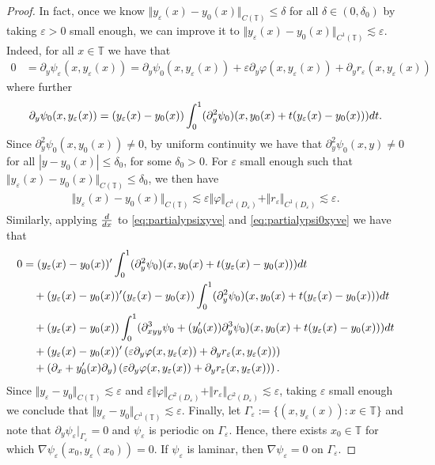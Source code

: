 \documentclass[10pt,a4paper]{amsart}
\newcommand{\rmd}{{\rm d}}
\newcommand{\ve}{\varepsilon}
\begin{document}
\begin{proof}
In fact, once we know $\Vert y_\ve(x) - y_0(x) \Vert_{C(\mathbb{T})}\leq \delta$ for all $\delta\in (0,\delta_0)$ by taking $\ve>0$ small enough, we can improve it to $\Vert y_\ve(x) - y_0(x) \Vert_{C^1(\mathbb{T})}\lesssim \ve$. Indeed, for all $x\in \mathbb{T}$ we have that
\begin{align}\label{eq:partialypsixyve}
0 &= \partial_y\psi_\ve(x,y_\ve(x)) = \partial_y \psi_0(x,y_\ve(x)) + \ve\partial_y\varphi(x,y_\ve(x)) + \partial_y r_\ve(x,y_\ve(x)) 
\end{align}
where further
\begin{align}\label{eq:partialypsi0xyve}
\partial_y \psi_0(x,y_\ve(x)) = (y_\ve(x) - y_0(x) ) \int_0^1 (\partial_y^2\psi_0)(x,y_0(x) + t(y_\ve(x) - y_0(x))) \rmd t.
\end{align}
Since $\partial_y^2\psi_0(x,y_0(x))\neq 0$, by uniform continuity we have that $\partial_y^2\psi_0(x,y)\neq 0$ for all $|y-y_0(x)|\leq \delta_0$, for some $\delta_0>0$. For $\ve$ small enough such that $\Vert y_\ve(x) - y_0(x) \Vert_{C(\mathbb{T})}\leq \delta_0$, we then have
\begin{align*}
\Vert y_\ve(x) - y_0(x) \Vert_{C(\mathbb{T})}\lesssim \ve \Vert \varphi \Vert_{C^1(D_{\ve})} + \Vert r_\ve \Vert_{C^1(D_{\ve})} \lesssim \ve.
\end{align*}
Similarly, applying $\frac{\rmd}{\rmd x}$ to \eqref{eq:partialypsixyve}  and \eqref{eq:partialypsi0xyve} we have that
\begin{align*}
0 &= (y_\ve(x) - y_0(x) )' \int_0^1 (\partial_y^2\psi_0)(x,y_0(x) + t(y_\ve(x) - y_0(x))) \rmd t \\  
&\quad + (y_\ve(x) - y_0(x) )'(y_\ve(x) - y_0(x) ) \int_0^1 (\partial_y^2\psi_0)(x,y_0(x) + t(y_\ve(x) - y_0(x))) \rmd t \\
&\quad + (y_\ve(x) - y_0(x) ) \int_0^1 (\partial_{xyy}^3\psi_0 + (y_0'(x))\partial_y^3\psi_0)(x,y_0(x) + t(y_\ve(x) - y_0(x))) \rmd t \\
&\quad + (y_\ve(x)-y_0(x))' \left( \ve \partial_y\varphi(x,y_\ve(x)) + \partial_y r_\ve(x,y_\ve(x)) \right) \\
&\quad + (\partial_x + y_0'(x)\partial_y)\left(\ve \partial_y\varphi(x,y_\ve(x)) + \partial_y r_\ve(x,y_\ve(x)) \right).
\end{align*}
Since $\Vert y_\ve - y_0 \Vert_{C(\mathbb{T})}\lesssim \ve$ and $\ve \Vert \varphi \Vert_{C^2(D_{\ve})} + \Vert r_\ve \Vert_{C^2(D_{\ve})}\lesssim \ve$, taking $\ve$ small enough we conclude that $\Vert y_\ve - y_0 \Vert_{C^1(\mathbb{T})}\lesssim \ve$. Finally, let $\Gamma_{\ve} := \lbrace (x, y_{\ve}(x)) : x\in \mathbb{T} \rbrace$ and note that $\partial_y\psi_{\ve}|_{\Gamma_{\ve}}=0$ and $\psi_\ve$ is periodic on $\Gamma_{\ve}$. Hence, there exists $x_0\in \mathbb{T}$ for which $\nabla\psi_{\ve}(x_0,y_{\ve}(x_0))=0$. If $\psi_{\ve}$ is laminar, then $\nabla\psi_{\ve}=0$ on $\Gamma_{\ve}$.
\end{proof}
\end{document}
